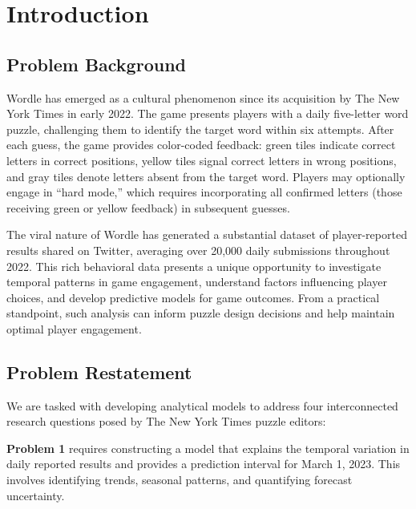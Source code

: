 \documentclass{mcmthesis}
\begin{document}
\tableofcontents
\newpage

\section{Introduction}

\subsection{Problem Background}

Wordle has emerged as a cultural phenomenon since its acquisition by The New York Times in early 2022. The game presents players with a daily five-letter word puzzle, challenging them to identify the target word within six attempts. After each guess, the game provides color-coded feedback: green tiles indicate correct letters in correct positions, yellow tiles signal correct letters in wrong positions, and gray tiles denote letters absent from the target word. Players may optionally engage in ``hard mode,'' which requires incorporating all confirmed letters (those receiving green or yellow feedback) in subsequent guesses.

The viral nature of Wordle has generated a substantial dataset of player-reported results shared on Twitter, averaging over 20,000 daily submissions throughout 2022. This rich behavioral data presents a unique opportunity to investigate temporal patterns in game engagement, understand factors influencing player choices, and develop predictive models for game outcomes. From a practical standpoint, such analysis can inform puzzle design decisions and help maintain optimal player engagement.

\subsection{Problem Restatement}

We are tasked with developing analytical models to address four interconnected research questions posed by The New York Times puzzle editors:

\textbf{Problem 1} requires constructing a model that explains the temporal variation in daily reported results and provides a prediction interval for March 1, 2023. This involves identifying trends, seasonal patterns, and quantifying forecast uncertainty.
\end{document}
